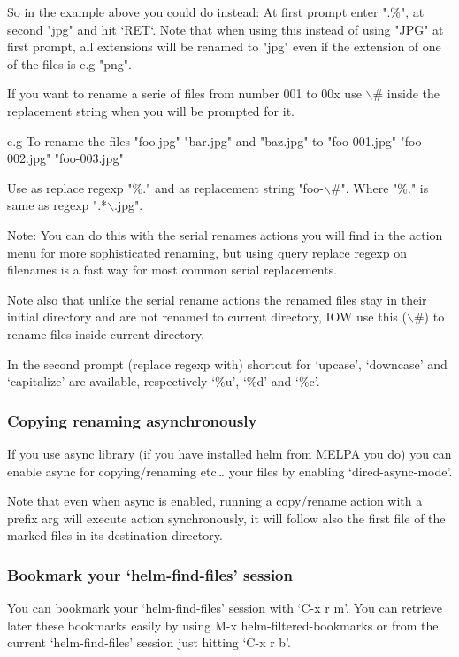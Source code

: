 \documentclass[11pt]{article}
\begin{document}
So in the example above you could do instead:
At first prompt enter ".\%", at second "jpg" and hit ‘RET‘.
Note that when using this instead of using "JPG" at first prompt, all extensions
will be renamed to "jpg" even if the extension of one of the files is e.g "png".

If you want to rename a serie of files from number 001 to 00x use $\backslash$# inside the replacement
string when you will be prompted for it.

e.g To rename the files "foo.jpg" "bar.jpg" and "baz.jpg"
    to "foo-001.jpg" "foo-002.jpg" "foo-003.jpg"

Use as replace regexp "\%." and as replacement string "foo-$\backslash$#".
Where "\%." is same as regexp ".*$\backslash$.jpg".

Note: You can do this with the serial renames actions you will find in the action menu
      for more sophisticated renaming, but using query replace regexp on filenames
      is a fast way for most common serial replacements.

Note also that unlike the serial rename actions the renamed files stay in their initial directory
and are not renamed to current directory, IOW use this ($\backslash$#) to rename files inside current directory.

In the second prompt (replace regexp with) shortcut for ‘upcase’, ‘downcase’ and ‘capitalize’
are available, respectively ‘\%u’, ‘\%d’ and ‘\%c’.

\subsubsection{Copying renaming asynchronously}
\label{sec:org821c118}

If you use async library (if you have installed helm from MELPA you do) you can enable
async for copying/renaming etc\ldots{} your files by enabling ‘dired-async-mode’.

Note that even when async is enabled, running a copy/rename action with a prefix arg
will execute action synchronously, it will follow also the first file of the marked files
in its destination directory.

\subsubsection{Bookmark your ‘helm-find-files’ session}
\label{sec:org619e63c}

You can bookmark your ‘helm-find-files’ session with ‘C-x r m’.
You can retrieve later these bookmarks easily by using M-x helm-filtered-bookmarks
or from the current ‘helm-find-files’ session just hitting ‘C-x r b’.
\end{document}

